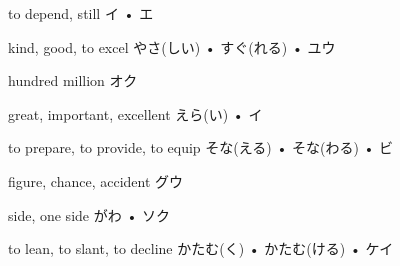 



\setcounter{cardnum}{25}

		{to depend, still}
		{イ • エ}
		{}{}
		{}{}
		{}{}
		{}{}
		{}{}

		{kind, good, to excel}
		{やさ(しい) • すぐ(れる) • ユウ}
		{}{}
		{}{}
		{}{}
		{}{}
		{}{}

		{hundred million}
		{オク}
		{}{}
		{}{}
		{}{}
		{}{}
		{}{}

		{great, important, excellent}
		{えら(い) • イ}
		{}{}
		{}{}
		{}{}
		{}{}
		{}{}

		{to prepare, to provide, to equip}
		{そな(える) • そな(わる) • ビ}
		{}{}
		{}{}
		{}{}
		{}{}
		{}{}

		{figure, chance, accident}
		{グウ}
		{}{}
		{}{}
		{}{}
		{}{}
		{}{}

		{side, one side}
		{がわ • ソク}
		{}{}
		{}{}
		{}{}
		{}{}
		{}{}

		{to lean, to slant, to decline}
		{かたむ(く) • かたむ(ける) • ケイ}
		{}{}
		{}{}
		{}{}
		{}{}
		{}{}

